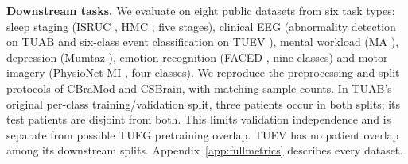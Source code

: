 \noindent\textbf{Downstream tasks.} We evaluate on eight public datasets from six task types:
sleep staging (ISRUC \cite{khalighi2016isruc}, HMC \cite{alvarez2021hmc}; five stages),
clinical EEG (abnormality detection on TUAB and six-class event classification on TUEV
\cite{obeid2016tuh}), mental workload (MA \cite{zyma2019mentalarith}), depression (Mumtaz
\cite{mumtaz2016mdd}), emotion recognition (FACED \cite{chen2023faced}, nine classes) and motor
imagery (PhysioNet-MI \cite{schalk2004bci2000}, four classes). We reproduce the preprocessing
and split protocols of CBraMod and CSBrain, with matching sample counts. In TUAB's original
per-class training/validation split, three patients occur in both splits; its test patients are
disjoint from both. This limits validation independence and is separate from possible TUEG
pretraining overlap. TUEV has no patient overlap among its downstream splits.
Appendix~\ref{app:fullmetrics} describes every dataset.
